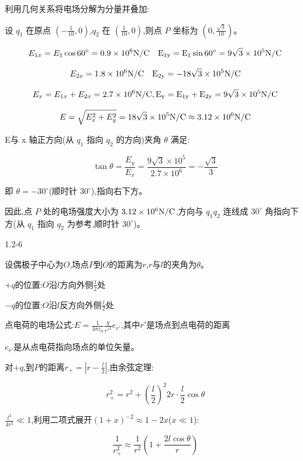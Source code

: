 \documentclass{article}
\begin{document}
利用几何关系将电场分解为分量并叠加:

设 $q_1$ 在原点 $(-\frac{1}{10},0)$,$q_2$ 在 $(\frac{1}{10}, 0)$,则点 $P$ 坐标为 $(0, \frac{\sqrt{3}}{10})$。

$$E_{1x} = E_1 \cos 60^\circ = 0.9 \times 10^6 \rm{N/C}\quad E_{1y} = E_1 \sin 60^\circ = 9\sqrt{3} \times 10^5 \rm{N/C}$$

$$E_{2x} =  1.8 \times 10^6 \rm{N/C}\quad E_{2y} =-18\sqrt{3} \times 10^5 \rm{N/C}$$

$$E_x = E_{1x} + E_{2x} = 2.7 \times 10^6 \rm{N/C},E_y = E_{1y} + E_{2y} = 9\sqrt{3} \times 10^5 \rm{N/C}$$

$$E = \sqrt{E_x^2 + E_y^2} = 18\sqrt{3}\times 10^5\rm{N/C} \approx 3.12 \times 10^6\rm{N/C}$$

E与 x 轴正方向(从 $q_1$ 指向 $q_2$ 的方向)夹角 $\theta$ 满足:

$$\tan \theta = \frac{E_y}{E_x} = \frac{9\sqrt{3} \times 10^5}{2.7 \times 10^6} = -\frac{\sqrt{3}}{3}$$

即 $\theta = -30^\circ$(顺时针 $30^\circ$),指向右下方。

因此,点 $P$ 处的电场强度大小为 $3.12 \times 10^6 \rm{N/C}$,方向与 $q_1q_2$ 连线成 $30^\circ$ 角指向下方(从 $q_1$ 指向 $q_2$ 为参考,顺时针 $30^\circ$)。


\newpage

1.2-6



设偶极子中心为$O$,场点$P$到$O$的距离为$r$,$r$与$l$的夹角为$\theta$。

$+q$的位置:$O$沿$l$方向外侧$\frac{l}{2}$处

$-q$的位置:$O$沿$l$反方向外侧$\frac{l}{2}$处

点电荷的电场公式:$E=\frac{1}{4\pi\varepsilon_0}\frac{q}{r'^2}e_{r'}$,其中$r'$是场点到点电荷的距离

$e_{r'}$是从点电荷指向场点的单位矢量。

对$+q$,到$P$的距离$r_+ = \left|r-\frac{l}{2}\right|$,由余弦定理:

$$r_+^2 = r^2 + \left(\frac{l}{2}\right)^2 2r\cdot\frac{l}{2}\cos\theta$$

$\frac{l^2}{4r^2}\ll1$,利用二项式展开$(1+x)^{-2}\approx1-2x$($x\ll1$):

$$\frac{1}{r_+^2}\approx\frac{1}{r^2}\left(1+\frac{2l\cos\theta}{r}\right)$$
\end{document}
